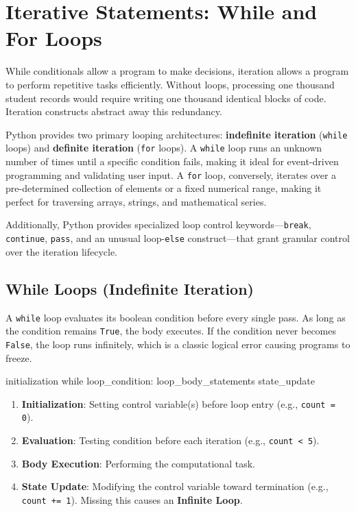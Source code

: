 \section{Iterative Statements: While and For Loops}

While conditionals allow a program to make decisions, iteration allows a program to perform repetitive tasks efficiently. Without loops, processing one thousand student records would require writing one thousand identical blocks of code. Iteration constructs abstract away this redundancy.

Python provides two primary looping architectures: \textbf{indefinite iteration} (\texttt{while} loops) and \textbf{definite iteration} (\texttt{for} loops). A \texttt{while} loop runs an unknown number of times until a specific condition fails, making it ideal for event-driven programming and validating user input. A \texttt{for} loop, conversely, iterates over a pre-determined collection of elements or a fixed numerical range, making it perfect for traversing arrays, strings, and mathematical series.

Additionally, Python provides specialized loop control keywords---\texttt{break}, \texttt{continue}, \texttt{pass}, and an unusual loop-\texttt{else} construct---that grant granular control over the iteration lifecycle.

\subsection{While Loops (Indefinite Iteration)}

A \texttt{while} loop evaluates its boolean condition before every single pass. As long as the condition remains \texttt{True}, the body executes. If the condition never becomes \texttt{False}, the loop runs infinitely, which is a classic logical error causing programs to freeze.

\begin{syntaxbox}
initialization
while loop\_condition:
    loop\_body\_statements
    state\_update
\end{syntaxbox}

\begin{conceptbox}
\begin{enumerate}[leftmargin=1.5em]
    \item \textbf{Initialization}: Setting control variable(s) before loop entry (e.g., \texttt{count = 0}).
    \item \textbf{Evaluation}: Testing condition before each iteration (e.g., \texttt{count < 5}).
    \item \textbf{Body Execution}: Performing the computational task.
    \item \textbf{State Update}: Modifying the control variable toward termination (e.g., \texttt{count += 1}). Missing this causes an \textbf{Infinite Loop}.
\end{enumerate}
\end{conceptbox}

